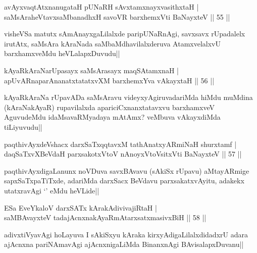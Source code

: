 
\begin{shl}
avAyxvaqtAtxnanugataH pUNaRH sAvxtamxnayxvasithxtaH |\\
saMsAraheVtavxsaMbanadhxH savoVR barxhemxVti BaNayxteV \hfill || 55 ||
\end{shl}

\begin{artha}
visheVSa matutx sAmAnayxgaLilalxde paripUNaRnAgi, savxsavx rUpadalelx irutAtx, saMsAra kAraNada saMbaMdhavilalxderuva AtamxvelalxvU barxhamxveMdu heVLalapxDuvudu||
\end{artha}

\begin{shl}
kAyaRkAraNarUpasayx saMsArasayx maqSAtamxnaH |\\
apUvARnaparAnanatxtatatxvXM barxhemxYva vAkayxtaH \hfill || 56 ||
\end{shl}

\begin{artha}%
kAyaRkAraNa rUpavADa saMsAravu videyxyAgiruvadariMda hiMdu muMdina (kAraNakAyaR) rupavilalxda apariciCxnanxtatavxvu barxhamxveV AguvudeMdu idaMsavaRMyadaya mAtAmx? veMbuva vAkayxdiMda tiLiyuvudu||
\end{artha}

\begin{shl}
paqthivAyxdeVshacx darxSaTxqqtavxM tathA\s natxyARmiNaH shurxtamf |\\
daqSaTxvXBeVdaH parxsakotxV\s toV nAnoyxV\s toV\s sitxVti BaNayxteV \hfill || 57 ||
\end{shl}

\begin{artha}
paqthivAyxdigaLanunx noVDuva savxBAvavu (sAkiSx rUpavu) aMtayARmige sapxSaTxpaTiTxde, adariMda darxSacx BeVdavu parxsakatxvAyitu, adakekx utatxravAgi `\stext ' eMdu heVLide||
\end{artha}


\begin{shl}
ESa EveYkaloV darxSATx kArakAdivivajiRtaH |\\
saMBAvayxteV tadajAcnxnakAyaRmAtarxsatxmasivxBiH \hfill || 58 ||
\end{shl}

\begin{artha}
adivxtiVyavAgi hoLayuva I sAkiSxyu kAraka kirxyAdigaLilalxdidadxrU adara ajAcnxna pariNAmavAgi ajAcnxnigaLiMda BinanxnAgi BAvisalapxDuvanu||
\end{artha}

